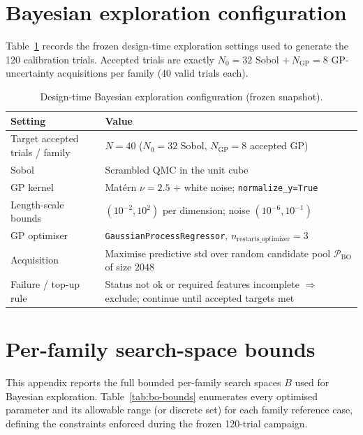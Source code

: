\documentclass[a4paper,fleqn]{cas-dc}
\begin{document}
\section{Bayesian exploration configuration}\label{app:bo-config}

Table~\ref{tab:bo-config} records the frozen design-time exploration settings
used to generate the 120 calibration trials. Accepted trials are exactly
$N_0{=}32$ Sobol $+\,N_{\mathrm{GP}}{=}8$ GP-uncertainty acquisitions per family
(40 valid trials each).

\begin{table}[t]
\caption{Design-time Bayesian exploration configuration (frozen snapshot).}\label{tab:bo-config}
\begin{tabular*}{\textwidth}{@{\extracolsep{\fill}} l l @{}}
\toprule
Setting & Value \\
\midrule
Target accepted trials / family & $N{=}40$ ($N_0{=}32$ Sobol, $N_{\mathrm{GP}}{=}8$ accepted GP) \\
Sobol & Scrambled QMC in the unit cube \\
GP kernel & Mat\'{e}rn $\nu{=}2.5$ $+$ white noise; \texttt{normalize\_y=True} \\
Length-scale bounds & $(10^{-2},10^{2})$ per dimension; noise $(10^{-6},10^{-1})$ \\
GP optimiser & \texttt{GaussianProcessRegressor}, $n_{\mathrm{restarts\_optimizer}}{=}3$ \\
Acquisition & Maximise predictive std over random candidate pool $\mathcal{P}_{\mathrm{BO}}$ of size $2048$ \\
Failure / top-up rule & Status not ok or required features incomplete $\Rightarrow$ exclude; continue until accepted targets met \\
\bottomrule
\end{tabular*}
\end{table}

\section{Per-family search-space bounds}\label{app:search-bounds}

This appendix reports the full bounded per-family search spaces $B$ used for Bayesian exploration. Table~\ref{tab:bo-bounds} enumerates every optimised parameter and its allowable range (or discrete set) for each family reference case, defining the constraints enforced during the frozen 120-trial campaign.
\end{document}

